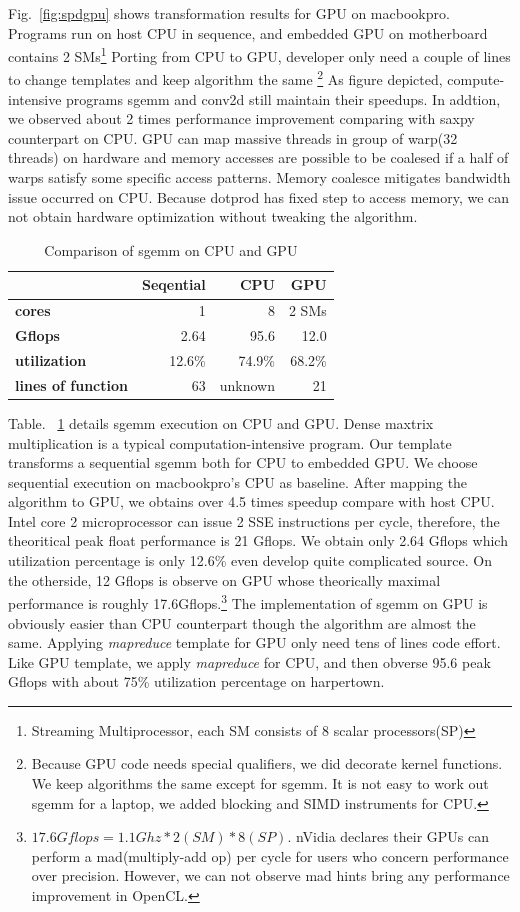 \documentclass[10pt, conference, compsocconf]{IEEEtran}
\begin{document}
Fig.~\ref{fig:spdgpu} shows transformation results for GPU on
macbookpro. Programs run on host CPU  in sequence, and embedded GPU on motherboard contains 2 SMs\footnote{Streaming
  Multiprocessor, each SM consists of 8 scalar processors(SP)}
Porting from CPU to GPU, developer only need a couple of lines to change
templates and keep algorithm the same \footnote{
Because GPU code needs special qualifiers, we did decorate kernel
functions. We keep algorithms the same except for sgemm. It is not easy
 to work out sgemm for a laptop, we added blocking and SIMD
 instruments for CPU.} As figure depicted,  compute-intensive programs
sgemm and conv2d still maintain their speedups. 
In addtion, we observed about 2 times performance improvement comparing with saxpy counterpart on CPU. GPU can map
massive threads in group of warp(32 threads) on hardware and memory
accesses are possible to  be coalesed if a half of warps satisfy some  specific access patterns. Memory coalesce
mitigates bandwidth issue occurred on CPU. Because dotprod has fixed
step to access memory, we can not obtain hardware optimization
without tweaking the algorithm.

\begin{table}[hbt]
\caption{Comparison of sgemm on CPU and GPU}\label{tbl:sgemm}
\begin{tabular}{|l|r|r|r|}
\hline
& Seqential& CPU & GPU\\
\hline
\textbf{cores} &1  & 8 & 2 SMs\\
\hline
\textbf{Gflops}& 2.64 &95.6&  12.0\\
\hline
\textbf{utilization}&12.6\%& 74.9\%&68.2\%\\
\hline
\textbf{lines of function}&63&unknown&21\\
\hline
\end{tabular}
\end{table}

Table. ~\ref{tbl:sgemm} details sgemm execution on CPU and GPU. Dense maxtrix
multiplication is a typical computation-intensive program.
Our template transforms a sequential sgemm both for  CPU to embedded GPU.
We choose sequential execution on macbookpro's CPU as baseline. After
mapping the algorithm to GPU, we obtains over 4.5 times speedup
compare with host CPU. Intel core 2 microprocessor can issue 2 SSE instructions per
cycle,  therefore, the theoritical peak float performance is 21
Gflops. We obtain only 2.64 Gflops which utilization percentage is only
12.6\% even develop quite complicated source. On the otherside, 12
Gflops is observe on GPU whose theorically maximal
performance is roughly 17.6Gflops.\footnote{$17.6Gflops = 1.1Ghz * 2(SM) *
  8(SP)$. nVidia declares their GPUs can perform a mad(multiply-add
  op) per cycle  for
  users who concern performance over precision. However, we can
  not observe mad hints bring any performance improvement in OpenCL. }  The
implementation of sgemm on GPU is obviously easier than CPU counterpart though
the algorithm are almost the same. Applying \emph{mapreduce} template
for GPU only need tens of lines code effort. Like GPU template, we apply
\emph{mapreduce} for CPU, and then obverse 95.6 peak
Gflops with about 75\% utilization percentage on harpertown.
\end{document}
